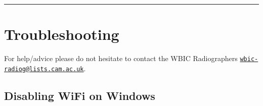 \documentclass[
]{book}
\begin{document}
\begin{center}\rule{0.5\linewidth}{0.5pt}\end{center}

\hypertarget{troubleshooting}{%
\section{Troubleshooting}\label{troubleshooting}}

For help/advice please do not hesitate to contact the WBIC Radiographers \href{mailto:wbic-radiog@lists.cam.ac.uk}{\nolinkurl{wbic-radiog@lists.cam.ac.uk}}.

\hypertarget{disabling-wifi-on-windows}{%
\subsection{Disabling WiFi on Windows}\label{disabling-wifi-on-windows}}
\end{document}
